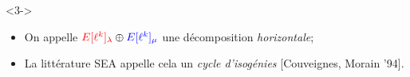 \documentclass[10pt,a4paper]{beamer}
\theoremstyle{plain}
\theoremstyle{definition}
\theoremstyle{definition}
\theoremstyle{definition}
\theoremstyle{definition}
\theoremstyle{remark}
\theoremstyle{remark}
\def\red#1{\textcolor{red}{#1}}
\def\blu#1{\textcolor{blue}{#1}}
\begin{document}
\begin{frame}
\begin{figure}[h]
\begin{center}
    \end{center}
  \end{figure}
\vspace{-4.5mm}
  \begin{uncoverenv}<3->
    \begin{itemize}
    \item On appelle $\red{E[\ell^k]_\lambda}\oplus\blu{E[\ell^k]_\mu}$ une
     décomposition \emph{horizontale};
    \item La littérature SEA appelle cela un \emph{cycle d'isogénies} [Couveignes, Morain '94].%
    \end{itemize}
  \end{uncoverenv}

\end{frame}

\end{document}
